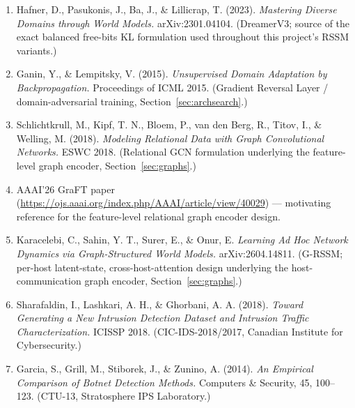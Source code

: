 \documentclass[11pt]{article}
\begin{document}
\begin{enumerate}[leftmargin=1.5em]
  \item Hafner, D., Pasukonis, J., Ba, J., \& Lillicrap, T. (2023). \emph{Mastering Diverse
  Domains through World Models.} arXiv:2301.04104. (DreamerV3; source of the exact balanced
  free-bits KL formulation used throughout this project's RSSM variants.)
  \item Ganin, Y., \& Lempitsky, V. (2015). \emph{Unsupervised Domain Adaptation by
  Backpropagation.} Proceedings of ICML 2015. (Gradient Reversal Layer / domain-adversarial
  training, Section~\ref{sec:archsearch}.)
  \item Schlichtkrull, M., Kipf, T. N., Bloem, P., van den Berg, R., Titov, I., \& Welling, M.
  (2018). \emph{Modeling Relational Data with Graph Convolutional Networks.} ESWC 2018.
  (Relational GCN formulation underlying the feature-level graph encoder,
  Section~\ref{sec:graphs}.)
  \item AAAI'26 GraFT paper (\url{https://ojs.aaai.org/index.php/AAAI/article/view/40029}) ---
  motivating reference for the feature-level relational graph encoder design.
  \item Karacelebi, C., Sahin, Y. T., Surer, E., \& Onur, E. \emph{Learning Ad Hoc Network
  Dynamics via Graph-Structured World Models.} arXiv:2604.14811. (G-RSSM; per-host
  latent-state, cross-host-attention design underlying the host-communication graph encoder,
  Section~\ref{sec:graphs}.)
  \item Sharafaldin, I., Lashkari, A. H., \& Ghorbani, A. A. (2018). \emph{Toward Generating a
  New Intrusion Detection Dataset and Intrusion Traffic Characterization.} ICISSP 2018.
  (CIC-IDS-2018/2017, Canadian Institute for Cybersecurity.)
  \item Garcia, S., Grill, M., Stiborek, J., \& Zunino, A. (2014). \emph{An Empirical
  Comparison of Botnet Detection Methods.} Computers \& Security, 45, 100--123. (CTU-13,
  Stratosphere IPS Laboratory.)
\end{enumerate}
\end{document}
